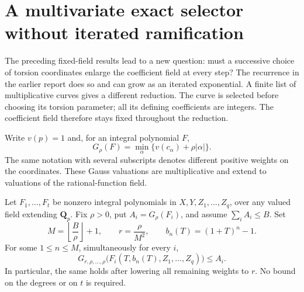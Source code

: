 \section{A multivariate exact selector without iterated ramification}
\label{sec:multi}
The preceding fixed-field results lead to a new question: must a successive
choice of torsion coordinates enlarge the coefficient field at every step?
The recurrence in the earlier report does so and can grow as an iterated
exponential. A finite list of multiplicative curves gives a different
reduction. The curve is selected before choosing its torsion parameter;
all its defining coefficients are integers. The coefficient field therefore
stays fixed throughout the reduction.

Write $v(p)=1$ and, for an integral polynomial $F$,
\[
 G_\rho(F)=\min_{\alpha}\{v(c_\alpha)+\rho|\alpha|\}.
\]
The same notation with several subscripts denotes different positive
weights on the coordinates. These Gauss valuations are multiplicative
and extend to valuations of the rational-function field.

\begin{lemma}
\label{lem:finite-slopes}
Let $F_1,\ldots,F_t$ be nonzero integral polynomials in
$X,Y,Z_1,\ldots,Z_q$, over any valued field extending $\mathbf Q_p$.
Fix $\rho>0$, put $A_i=G_\rho(F_i)$, and assume $\sum_i A_i\le B$.
Set
\[
 M=\left\lfloor\frac B\rho\right\rfloor+1,
 \qquad r=\frac\rho{M^2},\qquad b_n(T)=(1+T)^n-1.
\]
For some $1\le n\le M$, simultaneously for every $i$,
\[
 G_{r,\rho,\ldots,\rho}
   \bigl(F_i(T,b_n(T),Z_1,\ldots,Z_q)\bigr)\le A_i.
\]
In particular, the same holds after lowering all remaining weights to $r$.
No bound on the degrees or on $t$ is required.
\end{lemma}

